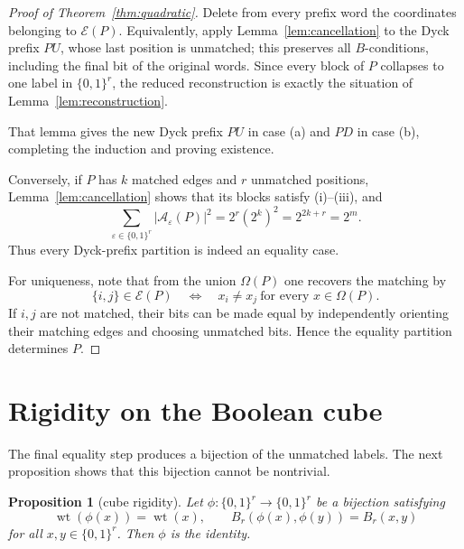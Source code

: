 \documentclass[11pt]{article}
\newtheorem{proposition}[theorem]{Proposition}
\theoremstyle{definition}
\newcommand{\wt}{\operatorname{wt}}
\newcommand{\A}{\mathcal A}
\newcommand{\E}{\mathcal E}
\newcommand{\Om}{\Omega}
\newcommand{\bits}{\{0,1\}}
\newcommand{\eps}{\varepsilon}
\begin{document}
\begin{proof}[Proof of Theorem~\ref{thm:quadratic}]
Delete from every prefix word the coordinates belonging to $\E(P)$.  Equivalently, apply Lemma~\ref{lem:cancellation} to the Dyck prefix $PU$, whose last position is unmatched; this preserves all $B$-conditions, including the final bit of the original words.  Since every block of $P$ collapses to one label in $\bits^r$, the reduced reconstruction is exactly the situation of Lemma~\ref{lem:reconstruction}.

\begin{samepage}
\noindent That lemma gives the new Dyck prefix $PU$ in case (a) and $PD$ in case (b), completing the induction and proving existence.
\end{samepage}  Conversely, if $P$ has $k$ matched edges and $r$ unmatched positions, Lemma~\ref{lem:cancellation} shows that its blocks satisfy (i)--(iii), and
\[
 \sum_{\eps\in\bits^r}|\A_{\eps}(P)|^2
 =2^r(2^k)^2=2^{2k+r}=2^m.
\]
Thus every Dyck-prefix partition is indeed an equality case.

For uniqueness, note that from the union $\Om(P)$ one recovers the matching by
\[
 \{i,j\}\in\E(P)
 \quad\Longleftrightarrow\quad
 x_i\ne x_j\ \text{for every }x\in\Om(P).
\]
If $i,j$ are not matched, their bits can be made equal by independently orienting their matching edges and choosing unmatched bits.  Hence the equality partition determines $P$.
\end{proof}

\section{Rigidity on the Boolean cube}

The final equality step produces a bijection of the unmatched labels.  The next proposition shows that this bijection cannot be nontrivial.

\begin{proposition}[cube rigidity]\label{prop:cuberigidity}
Let $\phi:\bits^r\to\bits^r$ be a bijection satisfying
\begin{equation}\label{eq:phi}
 \wt(\phi(x))=\wt(x),\qquad
 B_r(\phi(x),\phi(y))=B_r(x,y)
\end{equation}
for all $x,y\in\bits^r$.  Then $\phi$ is the identity.
\end{proposition}
\end{document}
